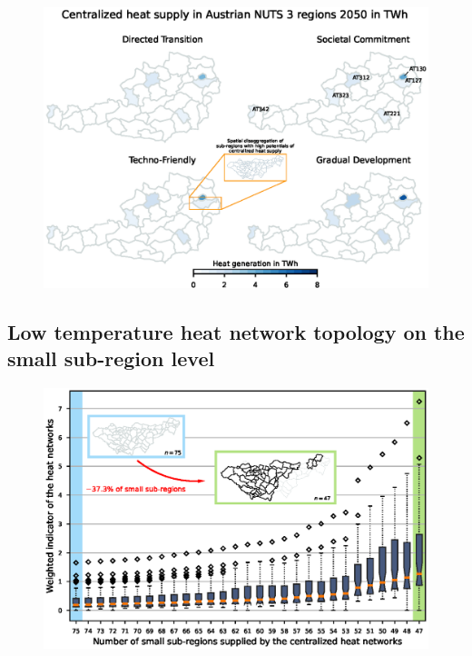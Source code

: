 
\begin{figure}
	\centering
	\includegraphics[width=1\linewidth]{figures/4_Results/Heatmap.eps}
	\caption{}
	\label{fig:res2}
\end{figure}

\subsection{Low temperature heat network topology on the small sub-region level}\label{res:4}

\begin{figure}
	\centering
	\includegraphics[width=1\linewidth]{figures/4_Results/boxplot.eps}
	\caption{}
	\label{fig:res3}
\end{figure}

